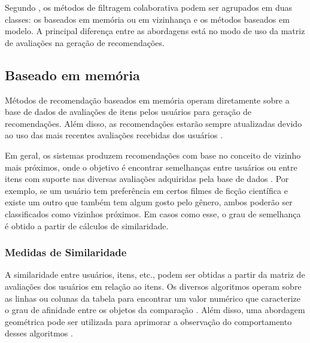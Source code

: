    Segundo , os métodos de filtragem colaborativa podem ser agrupados em duas classes: os baseados em memória ou em vizinhança e os métodos baseados em modelo. A principal diferença entre as abordagens está no modo de uso da matriz de avaliações na geração de recomendações. 
    
    
        
    \subsection{Baseado em memória}
        
        Métodos de recomendação baseados em memória operam diretamente sobre a base de dados de avaliações de itens pelos usuários para geração de recomendações. Além disso, as recomendações estarão sempre atualizadas devido ao uso das mais recentes avaliações recebidas dos usuários \cite{Bobadilla_2013}. 
        
        
        Em geral, os sistemas produzem recomendações com base no conceito de vizinho mais próximos, onde o objetivo é encontrar semelhanças entre usuários ou entre itens com suporte nas diversas avaliações adquiridas pela base de dados \cite{Mustafa2017}. Por exemplo, se um usuário tem preferência em certos filmes de ficção científica e existe um outro que também tem algum gosto pelo gênero, ambos poderão ser classificados como vizinhos próximos. Em casos como esse, o grau de semelhança é obtido a partir de cálculos de similaridade.
        
        \subsubsection{Medidas de Similaridade} \label{sssec:similaridade}
        
        A similaridade entre usuários, itens, etc., podem ser obtidas a partir da matriz de avaliações dos usuários em relação ao itens. Os diversos algoritmos operam sobre as linhas ou colunas da tabela para encontrar um valor numérico que caracterize o grau de afinidade entre os objetos da comparação \cite{Aggarwal2016}. Além disso, uma abordagem geométrica \cite{Jones1987} pode ser utilizada para aprimorar a observação do comportamento desses algoritmos .
        
